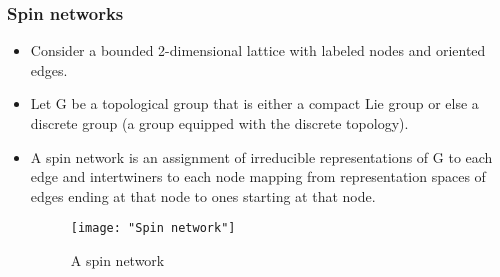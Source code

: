 \documentclass[11pt]{beamer}
\begin{document}
\begin{frame}
	
	\frametitle{Spin networks}
	
	\begin{itemize}
		
	

		\item Consider a bounded 2-dimensional lattice with labeled nodes and oriented edges.
		
		\item Let G be a topological group that is either a compact Lie group or else a discrete group (a group equipped with the discrete topology). 
		

		\item A spin network is an assignment of irreducible representations of G to each edge and intertwiners to each node mapping from representation spaces of edges ending at that node to ones starting at that node.
		
		\begin{figure}
			\centering
			\texttt{[image: "Spin network"]}
			\caption{A spin network}
			\label{fig:spin-network}
		\end{figure}
		
	\end{itemize}
	
\end{frame}
	
\end{document}
